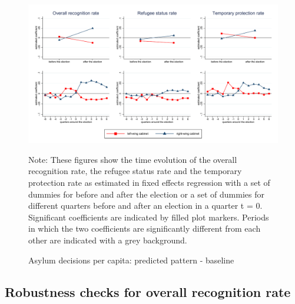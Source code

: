 \documentclass[11pt,a4paper]{scrartcl}
\begin{document}
\clearpage
\FloatBarrier
\begin{figure}[!ht]
	\caption{Asylum decisions per capita: predicted pattern - baseline}
	\centering
	\begin{minipage}{1\textwidth} 
		\includegraphics[width=\linewidth]{../results/decisions/dec_graphs_baseline.pdf}
		{\scriptsize Note: These figures show the time evolution of the overall recognition rate, the refugee status rate and the temporary protection rate as estimated in fixed effects regression with a set of dummies for before and after the election or a set of dummies for different quarters before and after an election in a quarter t = 0. Significant coefficients are indicated by filled plot markers. Periods in which the two coefficients are significantly different from each other are indicated with a grey background. \par}
	\end{minipage}
\end{figure}






\clearpage
\FloatBarrier
\subsection{Robustness checks for overall recognition rate}


\end{document}
